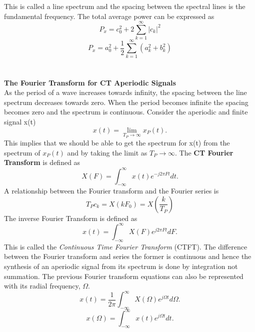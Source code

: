 \documentclass{article} %
\begin{document}
	This is called a line spectrum and the spacing between the spectral lines is the fundamental frequency. The total average power can be expressed as 
	\begin{equation}
 	P_x = c_0^2 + 2\sum_{k=1}^{\infty}|c_k|^2
	\end{equation}
	\begin{equation}
 	P_x = a_0^2 + \frac{1}{2}\sum_{k=1}^{\infty}(a_k^2 + b_k^2)
	\end{equation}
	\\
	\\
	\textbf{The Fourier Transform for CT Aperiodic Signals}\\
	As the period of a wave increases towards infinity, the spacing between the line spectrum decreases towards zero. When the period becomes
	infinite the spacing becomes zero and the spectrum is continuous. Consider the aperiodic and finite signal x(t)
	\begin{equation}
	x(t) = \lim_{T_P \rightarrow \infty}x_P(t).
	\end{equation}
	This implies that we should be able to get the spectrum for x(t) from the spectrum of $x_P(t)$ and by taking the limit as $T_P \rightarrow \infty$.
	The \textbf{CT Fourier Transform} is defined as
	\begin{equation}
	X(F) = \int_{-\infty}^{\infty}x(t)e^{-j2\pi Ft}dt.
	\end{equation}
	A relationship between the Fourier transform and the Fourier series is
	\begin{equation}
	T_Pc_k = X(kF_0) = X(\frac{k}{T_P})
	\end{equation}
	The inverse Fourier Transform is defined as 
	\begin{equation}
	x(t) = \int_{-\infty}^{\infty}X(F)e^{j2\pi Ft}dF.
	\end{equation}	
	This is called the \textit{Continuous Time Fourier Transform} (CTFT). The difference between the Fourier transform and series 
	the former is continuous and hence the synthesis of an aperiodic signal
	from its spectrum is done by integration not summation. The previous Fourier transform equations can also be represented
	with its radial frequency, $\Omega$.
	\begin{equation}
	x(t) = \frac{1}{2\pi}\int_{-\infty}^{\infty}X(\Omega)e^{j\Omega t}d \Omega.
	\end{equation}
	\begin{equation}
	x(\Omega) = \int_{-\infty}^{\infty}x(t)e^{j\Omega t}dt.
	\end{equation}
\end{document}
